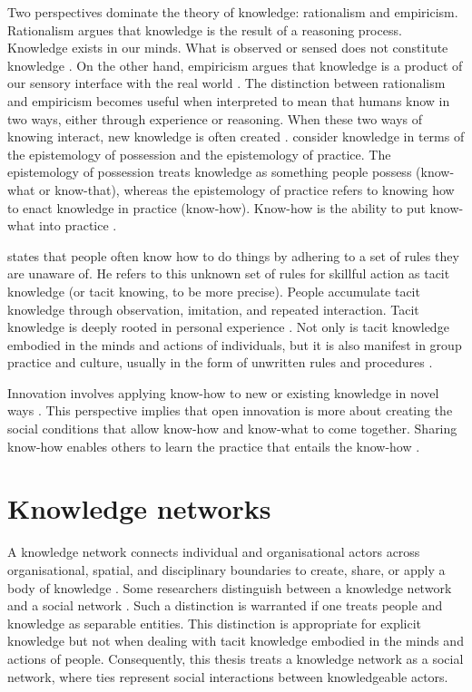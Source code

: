 Two perspectives dominate the theory of knowledge: rationalism and empiricism. Rationalism argues that knowledge is the result of a reasoning process. Knowledge exists in our minds. What is observed or sensed does not constitute knowledge \citep{russell2009human}. On the other hand, empiricism argues that knowledge is a product of our sensory interface with the real world \citep{bolisani2018elusive}. The distinction between rationalism and empiricism becomes useful when interpreted to mean that humans know in two ways, either through experience or reasoning. When these two ways of knowing interact, new knowledge is often created \citep{spender1996making,bolisani2018elusive}. \citet{cook1999bridging} consider knowledge in terms of the epistemology of possession and the epistemology of practice. The epistemology of possession treats knowledge as something people possess (know-what or know-that), whereas the epistemology of practice refers to knowing how to enact knowledge in practice (know-how). Know-how is the ability to put know-what into practice \citep{cook1999bridging,tsoukas2001organizational, marabelli2014knowing}. \medskip

\citet{polanyi1966tacit} states that people often know how to do things by adhering to a set of rules they are unaware of. He refers to this unknown set of rules for skillful action as tacit knowledge (or tacit knowing, to be more precise). People accumulate tacit knowledge through observation, imitation, and repeated interaction. Tacit knowledge is deeply rooted in personal experience \citep{nonaka1995knowledge}. Not only is tacit knowledge embodied in the minds and actions of individuals, but it is also manifest in group practice and culture, usually in the form of unwritten rules and procedures \citep{munoz2015tacit}. \medskip

Innovation involves applying know-how to new or existing knowledge in novel ways \citep{van1986central,quintane2011innovation,garud2013perspectives}. This perspective implies that open innovation is more about creating the social conditions that allow know-how and know-what to come together. Sharing know-how enables others to learn the practice that entails the know-how \citep{van1986central,goksel2017can}.

\section{Knowledge networks}

A knowledge network connects individual and organisational actors across organisational, spatial, and disciplinary boundaries to create, share, or apply a body of knowledge \citep{pugh2013designing}. Some researchers distinguish between a knowledge network and a social network \citep[e.g.][]{yayavaram2008decomposability,wang2014knowledge,brennecke2017firm}. Such a distinction is warranted if one treats people and knowledge as separable entities. This distinction is appropriate for explicit knowledge but not when dealing with tacit knowledge embodied in the minds and actions of people. Consequently, this thesis treats a knowledge network as a social network, where ties represent social interactions between knowledgeable actors. \medskip

